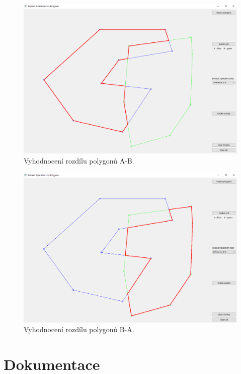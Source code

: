 \documentclass[a4paper, 12pt, oneside, titlepage]{article} %
\begin{document}
\begin{figure}[!htb]
	\centering
	\includegraphics[scale=0.4]{obrazky/rozAB.png} 
	\caption{Vyhodnocení rozdílu polygonů A-B.
	}
	\label{fig:rozAB}
\end{figure} 
\FloatBarrier

\begin{figure}[!htb]
	\centering
	\includegraphics[scale=0.4]{obrazky/rozBA.png} 
	\caption{Vyhodnocení rozdílu polygonů B-A.
	}
	\label{fig:rozBA}
\end{figure} 
\FloatBarrier

\section{Dokumentace}
\end{document}
